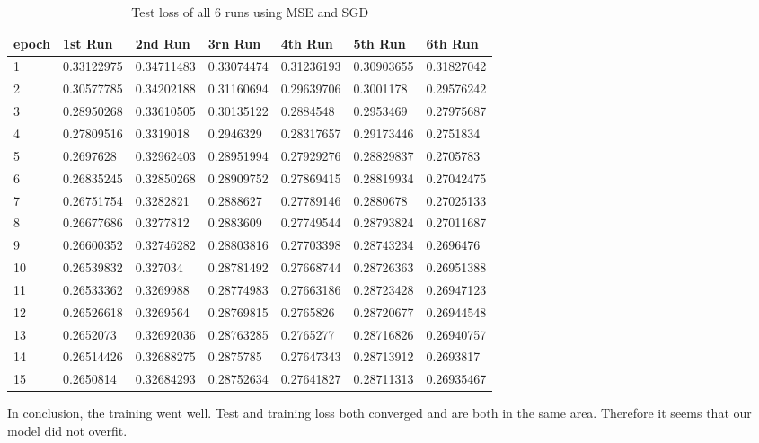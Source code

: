 \begin{table}[!ht]
    \centering
    \begin{tabular}{|l||l||l||l||l||l||l|}
    \hline
        epoch & 1st Run & 2nd Run & 3rn Run & 4th Run & 5th Run & 6th Run \\ \hline
        1 & 0.33122975 & 0.34711483 & 0.33074474 & 0.31236193 & 0.30903655 & 0.31827042 \\ \hline
        2 & 0.30577785 & 0.34202188 & 0.31160694 & 0.29639706 & 0.3001178 & 0.29576242 \\ \hline
        3 & 0.28950268 & 0.33610505 & 0.30135122 & 0.2884548 & 0.2953469 & 0.27975687 \\ \hline
        4 & 0.27809516 & 0.3319018 & 0.2946329 & 0.28317657 & 0.29173446 & 0.2751834 \\ \hline
        5 & 0.2697628 & 0.32962403 & 0.28951994 & 0.27929276 & 0.28829837 & 0.2705783 \\ \hline
        6 & 0.26835245 & 0.32850268 & 0.28909752 & 0.27869415 & 0.28819934 & 0.27042475 \\ \hline
        7 & 0.26751754 & 0.3282821 & 0.2888627 & 0.27789146 & 0.2880678 & 0.27025133 \\ \hline
        8 & 0.26677686 & 0.3277812 & 0.2883609 & 0.27749544 & 0.28793824 & 0.27011687 \\ \hline
        9 & 0.26600352 & 0.32746282 & 0.28803816 & 0.27703398 & 0.28743234 & 0.2696476 \\ \hline
        10 & 0.26539832 & 0.327034 & 0.28781492 & 0.27668744 & 0.28726363 & 0.26951388 \\ \hline
        11 & 0.26533362 & 0.3269988 & 0.28774983 & 0.27663186 & 0.28723428 & 0.26947123 \\ \hline
        12 & 0.26526618 & 0.3269564 & 0.28769815 & 0.2765826 & 0.28720677 & 0.26944548 \\ \hline
        13 & 0.2652073 & 0.32692036 & 0.28763285 & 0.2765277 & 0.28716826 & 0.26940757 \\ \hline
        14 & 0.26514426 & 0.32688275 & 0.2875785 & 0.27647343 & 0.28713912 & 0.2693817 \\ \hline
        15 & 0.2650814 & 0.32684293 & 0.28752634 & 0.27641827 & 0.28711313 & 0.26935467 \\ \hline
    \end{tabular}
    \caption{\label{tab:mse_sgd_test}Test loss of all 6 runs using MSE and SGD}
\end{table}

In conclusion, the training went well. Test and training loss both converged and are both in the same area.
Therefore it seems that our model did not overfit.

